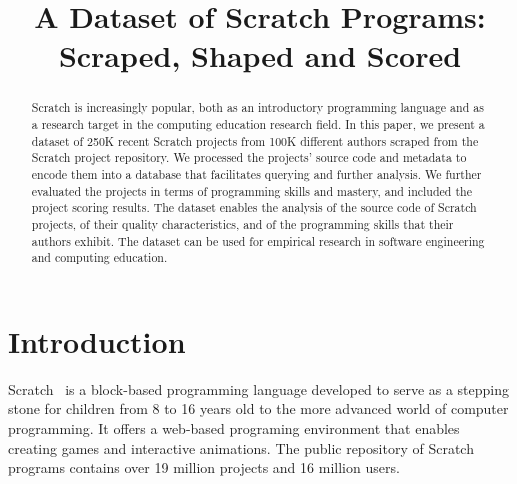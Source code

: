 \documentclass[10pt, conference]{IEEEtran}
\begin{document}
\title{A Dataset of Scratch Programs:\\Scraped, Shaped and Scored}


%	

\maketitle


\begin{abstract}
Scratch is increasingly popular, both as an introductory programming language and as a research target in the computing education research field.	
In this paper, we present a dataset of 250K recent Scratch projects from 100K different authors scraped from the Scratch project repository.
We processed the projects' source code and metadata to encode them into a database that facilitates querying and further analysis. We further evaluated the projects in terms of programming skills and mastery, and included the project scoring results.
The dataset enables the analysis of the source code of Scratch projects, of their quality characteristics, and of the programming skills that their authors exhibit.
The dataset can be used for empirical research in software engineering and computing education.
\end{abstract}
 
\section{Introduction}
Scratch~\cite{resnick_scratch:_2009} is a block-based programming language developed to serve as a stepping stone for children from 8 to 16 years old to the more advanced world of computer programming.
It offers a web-based programing environment that enables creating games and interactive animations. The public repository of Scratch programs contains over 19 million projects and 16 million users.
\end{document}
